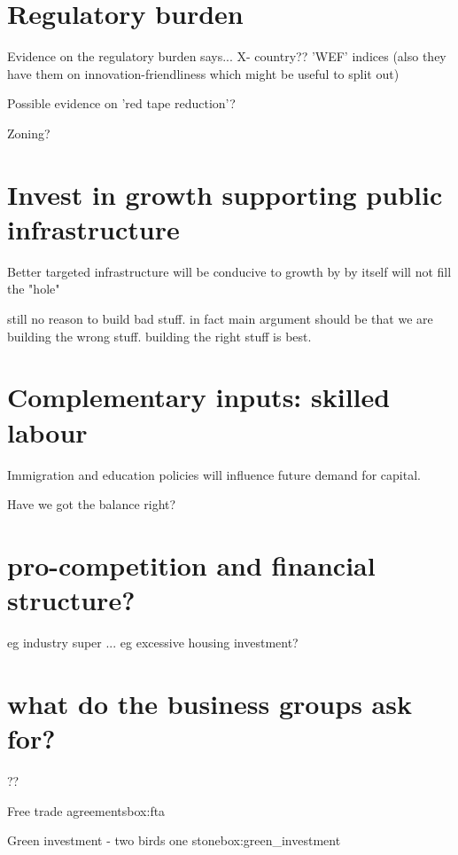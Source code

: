\section{Regulatory burden}

Evidence on the regulatory burden says...
X- country?? 'WEF' indices
(also they have them on innovation-friendliness which might be useful to split out)

Possible evidence on 'red tape reduction'? 

Zoning? 

\section{Invest in growth supporting public infrastructure}

Better targeted infrastructure will be conducive to growth by by itself will not fill the "hole"

still no reason to build bad stuff. in fact main argument should be that we are building the wrong stuff. building the right stuff is best. 
 
 \section{Complementary inputs: skilled labour}
 
 Immigration and education policies will influence future demand for capital. 
 
 Have we got the balance right? 
 
 \section{pro-competition and financial structure?}

eg industry super ...
eg excessive housing investment?


 \section{what do the business groups ask for?}
 ??

 
\begin{smallbox}{Free trade agreements}{box:fta}
\end{smallbox}

\begin{smallbox}
{Green investment - two birds one stone}{box:green_investment}
\end{smallbox}